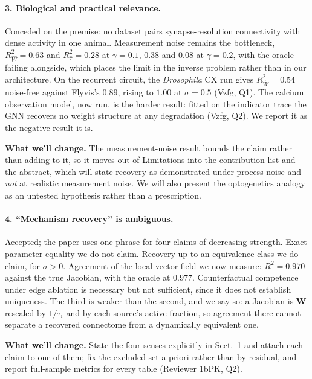 \documentclass[11pt]{article}
\newcommand{\Rw}{R^2_{\widehat W}}
\newcommand{\Rt}{R^2_{\hat\tau}}
\newcommand{\Mat}[1]{\mathbf{#1}}
\begin{document}
\paragraph{3. Biological and practical relevance.}
Conceded on the premise: no dataset pairs synapse-resolution connectivity with
dense activity in one animal. Measurement noise remains the bottleneck,
$\Rw = 0.63$ and $\Rt = 0.28$ at $\gamma = 0.1$, $0.38$ and $0.08$ at
$\gamma = 0.2$, with the oracle failing alongside, which places the limit in the
inverse problem rather than in our architecture. On the recurrent circuit, the
\emph{Drosophila} CX run gives $\Rw = 0.54$ noise-free against Flyvis's $0.89$,
rising to $1.00$ at $\sigma = 0.5$ (Vzfg, Q1). The calcium observation model,
now run, is the harder result: fitted on the indicator trace the GNN recovers no
weight structure at any degradation (Vzfg, Q2). We report it as the negative
result it is.

\textbf{What we'll change.} The measurement-noise result bounds the claim rather
than adding to it, so it moves out of Limitations into the contribution list and
the abstract, which will state recovery as demonstrated under process noise and
\emph{not} at realistic measurement noise. We will also present the optogenetics
analogy as an untested hypothesis rather than a prescription.

\paragraph{4. ``Mechanism recovery'' is ambiguous.}
Accepted; the paper uses one phrase for four claims of decreasing strength.
Exact parameter equality we do not claim. Recovery up to an equivalence class we
do claim, for $\sigma > 0$. Agreement of the local vector field we now measure:
$R^2 = 0.970$ against the true Jacobian, with the oracle at $0.977$. Counterfactual
competence under edge ablation is necessary but not sufficient, since it does not
establish uniqueness. The third is weaker than the second, and we say so: a
Jacobian is $\Mat{W}$ rescaled by $1/\tau_i$ and by each source's active
fraction, so agreement there cannot separate a recovered connectome from a
dynamically equivalent one.

\textbf{What we'll change.} State the four senses explicitly in Sect.~1 and attach
each claim to one of them; fix the excluded set a priori rather than by residual,
and report full-sample metrics for every table (Reviewer 1bPK, Q2).
\end{document}
